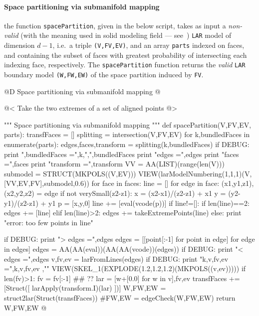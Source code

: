 \documentclass[11pt,oneside]{article}    %
\begin{document}
    

\paragraph{Space partitioning via submanifold mapping}

the function \texttt{spacePartition}, given in the below script, takes as input a \emph{non-valid} (with the meaning used in solid modeling field --- see~\cite{Requicha:1980:RRS:356827.356833}) \texttt{LAR} model of dimension $d-1$, i.e.~a triple \texttt{(V,FV,EV)}, and an array \texttt{parts} indexed on faces, and containing the subset of faces with greatest probability of intersecting each indexing face, respectively. The \texttt{spacePartition} function returns the \emph{valid} \texttt{LAR} boundary model \texttt{(W,FW,EW)} of the space partition induced by \texttt{FV}.
 
@D Space partitioning via submanifold mapping
@{@< Take the two extremes of a set of aligned points @>

""" Space partitioning via submanifold mapping """
def spacePartition(V,FV,EV, parts):
    transfFaces = []
    splitting = intersection(V,FV,EV)
    for k,bundledFaces in enumerate(parts):
        edges,faces,transform = splitting(k,bundledFaces)
        if DEBUG:
            print "\nk,bundledFaces =",k,",",bundledFaces
            print "edges =",edges
            print "faces =",faces
            print "transform =",transform
            VV = AA(LIST)(range(len(V)))
            submodel = STRUCT(MKPOLS((V,EV)))
            VIEW(larModelNumbering(1,1,1)(V,[VV,EV,FV],submodel,0.6)) 
        for face in faces:
            line = []
            for edge in face:
                (x1,y1,z1),(x2,y2,z2) = edge
                if not verySmall(z2-z1):
                    x = (x2-x1)/(z2-z1) + x1
                    y = (y2-y1)/(z2-z1) + y1
                    p = [x,y,0]
                    line += [eval(vcode(p))]
            if line!=[]: 
                if len(line)==2: edges += [line]
                elif len(line)>2: edges += takeExtremePoints(line)
                else: print "error: too few points in line"
            
        if DEBUG: print "> edges =",edges
        edges = [[point[:-1] for point in edge] for edge in edges]
        edges = AA(AA(eval))(AA(AA(vcode))(edges))
        if DEBUG: print "< edges =",edges
        v,fv,ev = larFromLines(edges) 
        if DEBUG:
            print "k,v,fv,ev =",k,v,fv,ev ,"\n"
            VIEW(SKEL_1(EXPLODE(1.2,1.2,1.2)(MKPOLS((v,ev)))))
        if len(fv)>1: fv = fv[:-1]   ## ??
        lar = [w+[0.0] for w in v],fv,ev
        transfFaces += [Struct([ larApply(transform.I)(lar) ])]
    W,FW,EW = struct2lar(Struct(transfFaces))
    #FW,EW = edgeCheck(W,FW,EW)
    return W,FW,EW
@}
\end{document}
